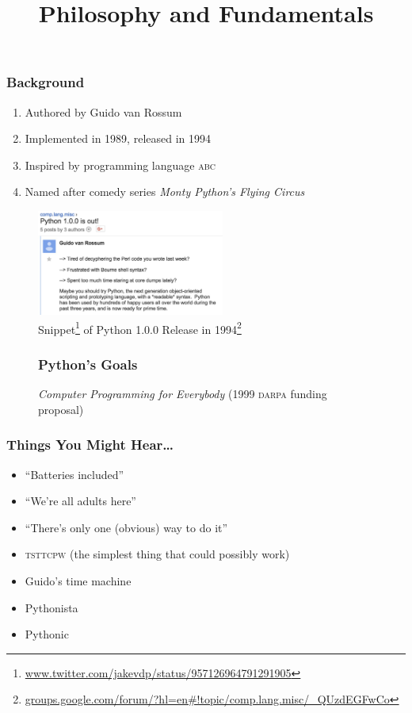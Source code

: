 \documentclass{beamer}
\title[Intro to Python]{Philosophy and Fundamentals}
\begin{document}
  \frame{\titlepage}

  \begin{frame}
    \frametitle{Background}
    \begin{enumerate}
      \item Authored by Guido van Rossum
      \item Implemented in 1989, released in 1994
      \item Inspired by programming language \textsc{abc}
      \item Named after comedy series \textit{Monty Python's Flying Circus}
    \end{enumerate}
    \begin{figure}
      \begin{center}
      \includegraphics[width=175pt,keepaspectratio]{release.jpg}
      \caption
      {
        Snippet\footnote{\url{www.twitter.com/jakevdp/status/957126964791291905}}
        of Python 1.0.0 Release in 
        1994\footnote
        {
         \url{groups.google.com/forum/?hl=en\#!topic/comp.lang.misc/_QUzdEGFwCo}
        }
      }
      \end{center}
    \end{figure}
  \end{frame}

  \begin{figure}
    \frametitle{Python's Goals}
    \textit{Computer Programming for Everybody} (1999 \textsc{darpa} funding
    proposal) 
    \begin{enumerate}

    \end{enumerate}
  \end{figure}

  \begin{frame}
    \frametitle{Things You Might Hear\ldots}
    \begin{itemize}
      \item ``Batteries included''
      \item ``We're all adults here''
      \item ``There's only one (obvious) way to do it''
      \item \textsc{tsttcpw} (the simplest thing that could possibly work)
      \item Guido's time machine
      \item Pythonista
      \item Pythonic
    \end{itemize}
  \end{frame}
\end{document}
